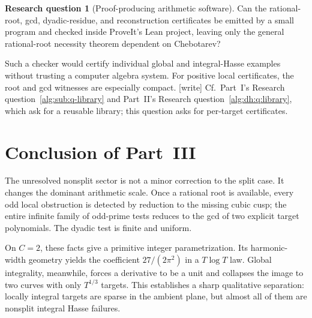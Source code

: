\documentclass[11pt]{article}
\numberwithin{equation}{section}
\theoremstyle{plain}
\theoremstyle{plain}
\theoremstyle{plain}
\theoremstyle{definition}
\theoremstyle{definition}
\newtheorem{question}[question]{Research question}
\theoremstyle{definition}
\theoremstyle{remark}
\newcommand{\wtag}{\textup{[write]}}%
\begin{document}
\begin{question}[Proof-producing arithmetic software]\label{alg:ns:q:software}
Can the rational-root, gcd, dyadic-residue, and reconstruction certificates
be emitted by a small program and checked inside ProveIt's Lean project,
leaving only the general rational-root necessity theorem dependent on
Chebotarev?
\end{question}
Such a checker would certify individual global and integral-Hasse
examples without trusting a computer algebra system. For positive local
certificates, the root and gcd witnesses are especially compact.
\wtag{} Cf.\ Part~I's Research question~\ref{alg:sub:q-library} and
Part~II's Research question~\ref{alg:dh:q:library}, which ask for a
reusable library; this question asks for per-target certificates.

\section{Conclusion of Part~III}\label{alg:ns:sec:conclusion}
The unresolved nonsplit sector is not a minor correction to the split
case. It changes the dominant arithmetic scale. Once a rational root
is available, every odd local obstruction is detected by reduction to
the missing cubic cusp; the entire infinite family of odd-prime tests
reduces to the gcd of two explicit target polynomials. The dyadic test
is finite and uniform.

On $C=2$, these facts give a primitive integer parametrization. Its
harmonic-width geometry yields the coefficient
$27/(2\pi^2)$ in a $T\log T$ law. Global integrality, meanwhile, forces
a derivative to be a unit and collapses the image to two curves with
only $T^{1/3}$ targets. This establishes a sharp qualitative separation:
locally integral targets are sparse in the ambient plane, but almost
all of them are nonsplit integral Hasse failures.
\end{document}
